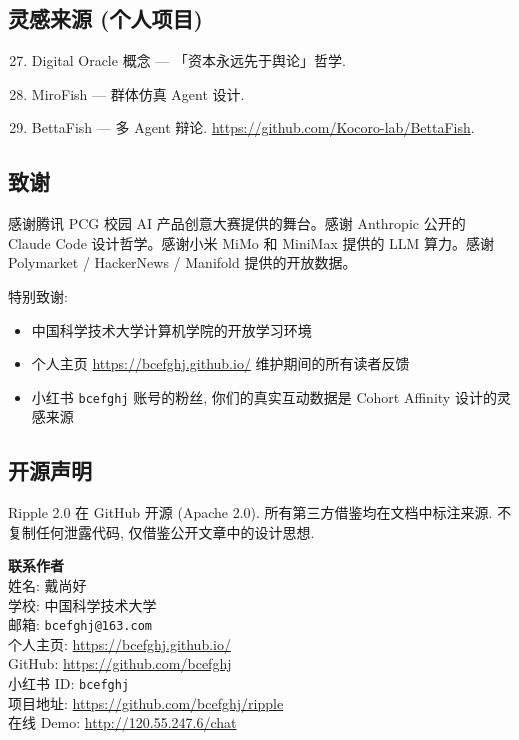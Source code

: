\subsection{灵感来源 (个人项目)}

\begin{enumerate}
    \setcounter{enumi}{26}
    \item Digital Oracle 概念 — 「资本永远先于舆论」哲学.
    \item MiroFish — 群体仿真 Agent 设计.
    \item BettaFish — 多 Agent 辩论. \url{https://github.com/Kocoro-lab/BettaFish}.
\end{enumerate}

\subsection{致谢}

感谢腾讯 PCG 校园 AI 产品创意大赛提供的舞台。感谢 Anthropic 公开的 Claude Code 设计哲学。感谢小米 MiMo 和 MiniMax 提供的 LLM 算力。感谢 Polymarket / HackerNews / Manifold 提供的开放数据。

特别致谢:
\begin{itemize}
    \item 中国科学技术大学计算机学院的开放学习环境
    \item 个人主页 \url{https://bcefghj.github.io/} 维护期间的所有读者反馈
    \item 小红书 \texttt{bcefghj} 账号的粉丝, 你们的真实互动数据是 Cohort Affinity 设计的灵感来源
\end{itemize}

\subsection{开源声明}

Ripple 2.0 在 GitHub 开源 (Apache 2.0). 所有第三方借鉴均在文档中标注来源. 不复制任何泄露代码, 仅借鉴公开文章中的设计思想.

\begin{quote-box}
\textbf{联系作者}\\
姓名: 戴尚好\\
学校: 中国科学技术大学\\
邮箱: \texttt{bcefghj@163.com}\\
个人主页: \url{https://bcefghj.github.io/}\\
GitHub: \url{https://github.com/bcefghj}\\
小红书 ID: \texttt{bcefghj}\\
项目地址: \url{https://github.com/bcefghj/ripple}\\
在线 Demo: \url{http://120.55.247.6/chat}
\end{quote-box}
